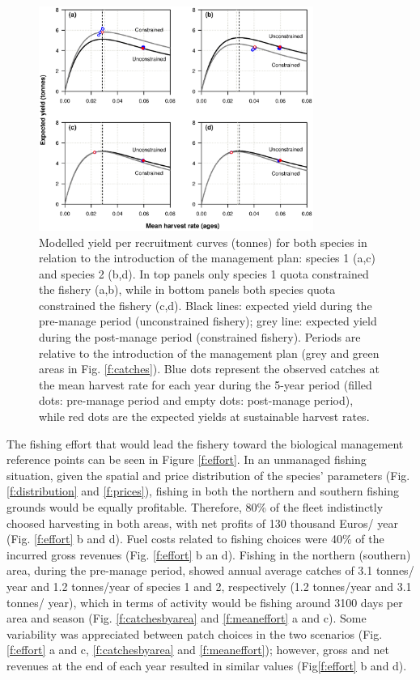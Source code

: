 \documentclass[12pt,oneline,a4paper,numbib]{ouparticle}
\numberwithin{equation}{subsection} %
\begin{document}
\begin{figure}[!ht]
\centering
\includegraphics[width=0.8\textwidth]{Figures/Yields.eps} 
\caption{Modelled yield per recruitment curves (tonnes) for both species in relation to the introduction of the management plan: species 1 (a,c) and species 2 (b,d). In top panels only species 1 quota constrained the fishery (a,b), while in bottom panels both species quota constrained the fishery (c,d). Black lines: expected yield during the pre-manage period (unconstrained fishery); grey line: expected yield during the post-manage period (constrained fishery). Periods are relative to the introduction of the management plan (grey and green areas in Fig. \ref{f:catches}). Blue dots represent the observed catches at the mean harvest rate for each year during the 5-year period (filled dots: pre-manage period and empty dots: post-manage period), while red dots are the expected yields at sustainable harvest rates.}
\label{f:yields}
\end{figure}

The fishing effort that would lead the fishery toward the biological management reference points can be seen in Figure \ref{f:effort}. In an unmanaged fishing situation, given the spatial and price distribution of the species' parameters (Fig. \ref{f:distribution} and  \ref{f:prices}), fishing in both the northern and southern fishing grounds would be equally profitable. Therefore, 80\% of the fleet  indistinctly choosed harvesting in both areas, with net profits of 130 thousand Euros/ year (Fig. \ref{f:effort} b and d). Fuel costs related to fishing choices were 40\% of the incurred gross revenues (Fig. \ref{f:effort} b an d). Fishing in the northern (southern) area, during the pre-manage period, showed annual average catches of 3.1 tonnes/ year and 1.2 tonnes/year of species 1 and 2, respectively (1.2 tonnes/year and 3.1 tonnes/ year), which in terms of activity would be fishing around 3100 days per area and season (Fig. \ref{f:catchesbyarea} and  \ref{f:meaneffort} a and c). Some variability was appreciated between patch choices in the two scenarios (Fig. \ref{f:effort} a and c, \ref{f:catchesbyarea} and  \ref{f:meaneffort}); however, gross and net revenues at the end of each year resulted in similar values (Fig\ref{f:effort} b and d). 
\end{document}
